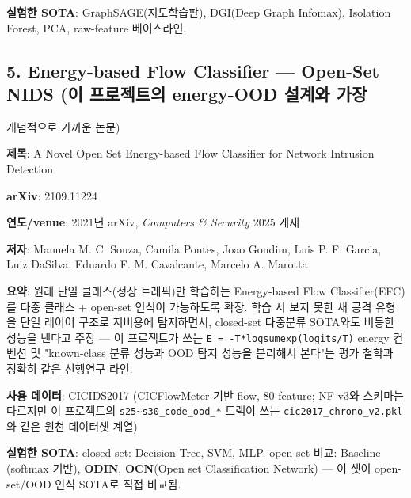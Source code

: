 \par\noindent \textbullet\enspace \textbf{실험한 SOTA}: GraphSAGE(지도학습판), DGI(Deep Graph Infomax), Isolation Forest, PCA, raw-feature 베이스라인.


\subsection{5. Energy-based Flow Classifier — Open-Set NIDS (이 프로젝트의 energy-OOD 설계와 가장}
개념적으로 가까운 논문)

\par\noindent \textbullet\enspace \textbf{제목}: A Novel Open Set Energy-based Flow Classifier for Network Intrusion Detection


\par\noindent \textbullet\enspace \textbf{arXiv}: 2109.11224


\par\noindent \textbullet\enspace \textbf{연도/\allowbreak{}venue}: 2021년 arXiv, \emph{Computers \& Security} 2025 게재


\par\noindent \textbullet\enspace \textbf{저자}: Manuela M. C. Souza, Camila Pontes, Joao Gondim, Luis P. F. Garcia, Luiz DaSilva, Eduardo F. M. Cavalcante, Marcelo A. Marotta


\par\noindent \textbullet\enspace \textbf{요약}: 원래 단일 클래스(정상 트래픽)만 학습하는 Energy-based Flow Classifier(EFC)를 다중 클래스 +\allowbreak{} open-set 인식이 가능하도록 확장. 학습 시 보지 못한 새 공격 유형을 단일 레이어 구조로 저비용에 탐지하면서, closed-set 다중분류 SOTA와도 비등한 성능을 낸다고 주장 — 이 프로젝트가 쓰는 \texttt{E =\allowbreak{}\allowbreak{} -\allowbreak{}T*l\allowbreak{}ogsumexp\allowbreak{}(logits/\allowbreak{}\allowbreak{}T)} energy 컨벤션 및 "known-class 분류 성능과 OOD 탐지 성능을 분리해서 본다"는 평가 철학과 정확히 같은 선행연구 라인.


\par\noindent \textbullet\enspace \textbf{사용 데이터}: CICIDS2017 (CICFlowMeter 기반 flow, 80-feature; NF-v3와 스키마는 다르지만 이 프로젝트의 \texttt{s25\textasciitilde{}s30\_\allowbreak{}\allowbreak{}code\_\allowbreak{}\allowbreak{}ood\allowbreak{}\_\allowbreak{}\allowbreak{}*} 트랙이 쓰는 \texttt{cic2017\_\allowbreak{}\allowbreak{}chrono\_\allowbreak{}\allowbreak{}v\allowbreak{}2.\allowbreak{}pkl}와 같은 원천 데이터셋 계열)


\par\noindent \textbullet\enspace \textbf{실험한 SOTA}: closed-set: Decision Tree, SVM, MLP. open-set 비교: Baseline (softmax 기반), \textbf{ODIN}, \textbf{OCN}(Open set Classification Network) — 이 셋이 open-set/\allowbreak{}OOD 인식 SOTA로 직접 비교됨.


